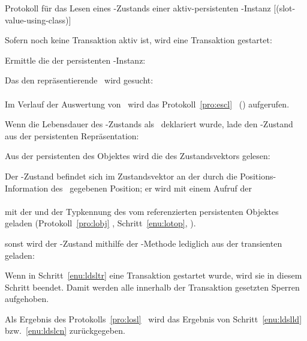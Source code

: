 \begin{infol}
%
\acaption%
 {{Protokoll f\"{u}r das Lesen eines \protect\Slt\/-Zustands einer
   aktiv-persistenten \protect\clos-Instanz}}%
 [(slot-value-using-class)]%
 \label{pro:losl}%
%
\item\label{enu:ldsltr} Sofern noch keine Transaktion aktiv ist, wird
eine Transaktion gestartet:\\
%
\item Ermittle die \sobjid\/ der persistenten \clos-Instanz:\\
%
\item Das den \Slt\/ repr\"{a}sentierende \sltdo\ wird gesucht:\\
\\
Im Verlauf der Auswertung von
\ wird das
Protokoll~\ref{pro:escl}
\stfn{\enscldescr}\ (\citepage{\pageref{pro:escl}}) aufgerufen.
%
\item Wenn die Lebensdauer des \Slt\/-Zustands als
\ deklariert wurde, lade den
\Slt\/-Zustand aus der persistenten Repr\"{a}sentation:
%
\begin{block}
%
\item Aus der persistenten \representation{} des Objektes wird die
\sobjid\/ des Zustandsvektors gelesen:\\
%
\item\label{enu:ldslld} Der \Slt\/-Zustand befindet sich im
Zustandsvektor an der durch die Po\-si\-tions-In\-for\-ma\-tion des
\sltdo[es]\ gegebenen Position; er wird mit einem Aufruf der \gfn\\
\\
mit der \sobjid\/ und der Typkennung des vom \Slt\/ referenzierten
persistenten Objektes geladen (Protokoll~\ref{pro:lobj}
, Schritt~\ref{enu:lotop},
\citepage{\pageref{enu:lotop}}).
%
\end{block}
%
\item\label{enu:ldslcn} sonst wird der \Slt\/-Zustand mithilfe der
\std-Methode lediglich aus der transienten \representation{} geladen:\\
%
\item Wenn in Schritt~\ref{enu:ldsltr} eine Transaktion gestartet
wurde, wird sie in diesem Schritt beendet. Damit werden alle innerhalb
der Transaktion gesetzten Sperren aufgehoben.
%
\item Als Ergebnis des Protokolls~\ref{pro:losl}
\ wird das Ergebnis von
Schritt~\ref{enu:ldslld} bzw.\ \ref{enu:ldslcn}
zu\-r\"{u}ck\-ge\-ge\-ben.
%
\end{infol}
